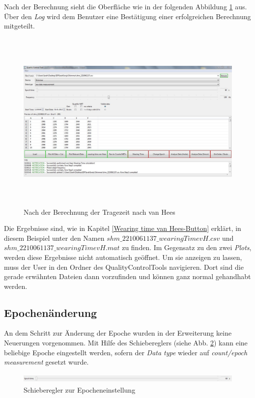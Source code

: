 \documentclass[onecolumn,german]{article}
\begin{document}
Nach der Berechnung sieht die Oberfläche wie in der folgenden Abbildung \ref{wTvH} aus. Über den \textit{Log} wird dem Benutzer eine Bestätigung einer erfolgreichen Berechnung mitgeteilt. \newline

\begin{figure}[H]
\centerline{
\includegraphics[width=160mm, height=90mm]{Abbildungen/wearingTimevH.JPG}
}
\caption {Nach der Berechnung der Tragezeit nach van Hees}
\label{wTvH}
\end{figure}

Die Ergebnisse sind, wie in Kapitel \ref{Wearing time van Hees-Button} erklärt, in diesem Beispiel unter den Namen \textit{$shm\_2210061137\_wearingTimevH.csv$} und \textit{$shm\_2210061137\_wearingTimevH.mat$} zu finden. Im Gegensatz zu den zwei \textit{Plots}, werden diese Ergebnisse nicht automatisch geöffnet. Um sie anzeigen zu lassen, muss der User in den Ordner des QualityControlTools navigieren. Dort sind die gerade erwähnten Dateien dann vorzufinden und können ganz normal gehandhabt werden. 

\subsection{Epochenänderung}

An dem Schritt zur Änderung der Epoche wurden in der Erweiterung keine Neuerungen vorgenommen. Mit Hilfe des Schiebereglers (siehe Abb. \ref{epoch}) kann eine beliebige Epoche eingestellt werden, sofern der \textit{Data type} wieder auf \textit{count/epoch measurement} gesetzt wurde.

\begin{figure}[H]
\centerline{
\includegraphics[width=160mm, height=5mm]{Abbildungen/epoch.png}
}
\caption {Schieberegler zur Epocheneinstellung}
\label{epoch}
\end{figure}
\end{document}
